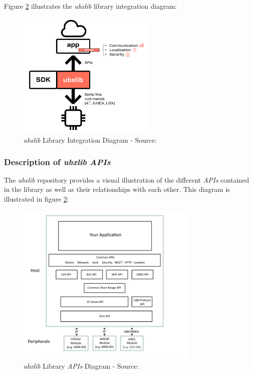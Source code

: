 \documentclass[report.tex]{subfiles}
\begin{document}
\begin{flushleft}
Figure \ref{fig:ubxlib_high_level} illustrates the \textit{ubxlib} library integration diagram:
\end{flushleft}
\begin{figure}[H]
	\centering
	\includegraphics[width=0.6\textwidth]{Include/Figure/software/ubxlib_high_level.png}
	\caption{\textit{ubxlib} Library Integration Diagram - Source:\cite{ubx_lib}}
	\label{fig:ubxlib_high_level}
\end{figure}

\pagebreak

\subsubsection{Description of \textit{ubxlib} \textit{APIs}}

The \textit{ubxlib} repository\cite{ubx_lib} provides a visual illustration of the different \textit{APIs} contained in the library as well as their relationships with each other. This diagram is illustrated in figure \ref{fig:ubxlib_high_level}:

\begin{figure}[H]
	\centering
	\includegraphics[width=0.8\textwidth]{Include/Figure/software/apis.jpg}
	\caption{\textit{ubxlib} Library \textit{APIs} Diagram - Source:\cite{ubx_lib}}
	\label{fig:ubxlib_high_level}
\end{figure}
\end{document}
